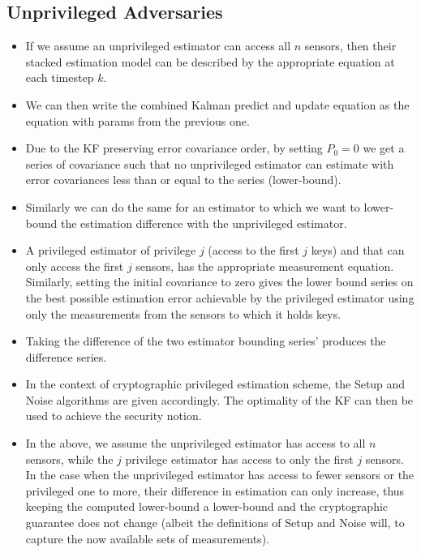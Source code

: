 \documentclass[conference]{IEEEtran}
\begin{document}
\subsection{Unprivileged Adversaries}\label{subsec:crypto_unprivileged}
\begin{itemize}
  \item If we assume an unprivileged estimator can access all $n$ sensors, then their stacked estimation model can be described by the appropriate equation at each timestep $k$. 
  \item We can then write the combined Kalman predict and update equation as the equation with params from the previous one.
  \item Due to the KF preserving error covariance order, by setting $P_0=0$ we get a series of covariance such that no unprivileged estimator can estimate with error covariances less than or equal to the series (lower-bound).
  \item Similarly we can do the same for an estimator to which we want to lower-bound the estimation difference with the unprivileged estimator. 
  \item A privileged estimator of privilege $j$ (access to the first $j$ keys) and that can only access the first $j$ sensors, has the appropriate measurement equation. Similarly, setting the initial covariance to zero gives the lower bound series on the best possible estimation error achievable by the privileged estimator using only the measurements from the sensors to which it holds keys.
  \item Taking the difference of the two estimator bounding series' produces the difference series.
  \item In the context of cryptographic privileged estimation scheme, the Setup and Noise algorithms are given accordingly. The optimality of the KF can then be used to achieve the security notion.
  \item In the above, we assume the unprivileged estimator has access to all $n$ sensors, while the $j$ privilege estimator has access to only the first $j$ sensors. In the case when the unprivileged estimator has access to fewer sensors or the privileged one to more, their difference in estimation can only increase, thus keeping the computed lower-bound a lower-bound and the cryptographic guarantee does not change (albeit the definitions of Setup and Noise will, to capture the now available sets of measurements).
\end{itemize}
\end{document}
